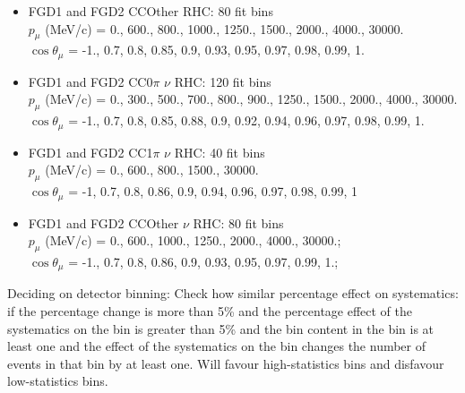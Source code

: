 \begin{itemize}
  \item FGD1 and FGD2 CCOther RHC: 80 fit bins \\
    $p_\mu$ (MeV/c) = 0., 600., 800., 1000., 1250., 1500., 2000., 4000., 30000.\\
    $\cos\theta_\mu$ = -1., 0.7, 0.8, 0.85, 0.9, 0.93, 0.95, 0.97, 0.98, 0.99, 1.\\

  \item FGD1 and FGD2 CC0$\pi$ $\nu$ RHC: 120 fit bins \\
    $p_\mu$ (MeV/c) = 0., 300., 500., 700., 800., 900., 1250., 1500., 2000., 4000., 30000.\\
     $\cos\theta_\mu$ = -1., 0.7, 0.8, 0.85, 0.88, 0.9, 0.92, 0.94, 0.96, 0.97, 0.98, 0.99, 1.\\

   \item FGD1 and FGD2 CC1$\pi$ $\nu$ RHC: 40 fit bins \\
     $p_\mu$ (MeV/c) = 0., 600., 800., 1500., 30000.\\
      $\cos\theta_\mu$ = -1, 0.7, 0.8, 0.86, 0.9, 0.94, 0.96, 0.97, 0.98, 0.99, 1\\

    \item FGD1 and FGD2 CCOther $\nu$ RHC: 80 fit bins \\
      $p_\mu$ (MeV/c) = 0., 600., 1000., 1250., 2000., 4000., 30000.;\\
       $\cos\theta_\mu$ = -1., 0.7, 0.8, 0.86, 0.9, 0.93, 0.95, 0.97, 0.99, 1.;\\
\end{itemize}

    Deciding on detector binning: 
    Check how similar percentage effect on systematics: if the percentage change is more than 5\% and the percentage effect of the systematics on the bin is greater than 5\% and the bin content in the bin is at least one and the effect of the systematics on the bin changes the number of events in that bin by at least one.
    Will favour high-statistics bins and disfavour low-statistics bins.

